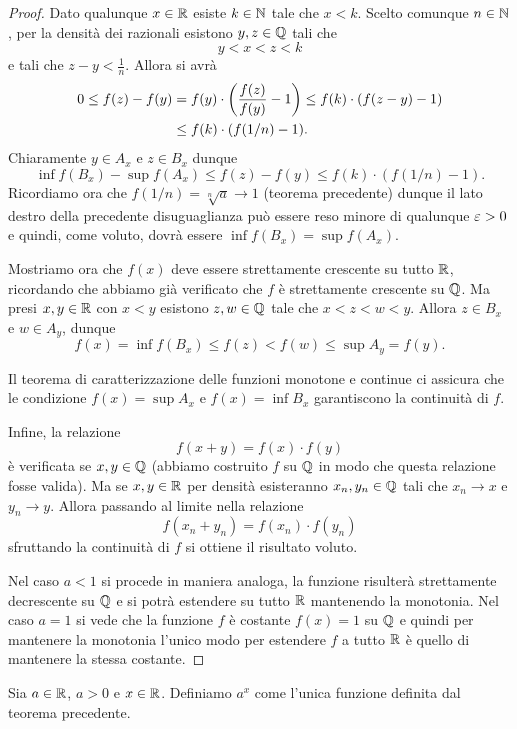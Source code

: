 \begin{proof}
Dato qualunque $x\in \mathbb R$ esiste $k\in \mathbb N$ tale che $x < k$.
Scelto comunque $n \in \mathbb N$, per la densità dei razionali
esistono $y,z\in \mathbb Q$ tali che
\[
  y < x < z < k
\]
e tali che $z-y< \frac 1 n$. Allora si avrà
\begin{align*}
  0 \le f(z) - f(y)
  &= f(y)\cdot{\left( \frac{f(z)}{f(y)}-1 \right)}
  \le f(k)\cdot {\left( f(z-y)-1 \right)}\\
  &\le f(k)\cdot {\left( f(1/n)-1 \right)}.
\end{align*}
Chiaramente $y\in A_x$ e $z\in B_x$ dunque
\[
\inf f(B_x) - \sup f(A_x) \le f(z) - f(y) \le f(k) \cdot (f(1/n)-1).
\]
Ricordiamo ora che $f(1/n) = \sqrt[n]{a} \to 1$ (teorema precedente)
dunque il lato destro della precedente disuguaglianza può essere reso
minore di qualunque $\varepsilon>0$
e quindi, come voluto,
dovrà essere $\inf f(B_x) = \sup f(A_x)$.

Mostriamo ora che $f(x)$ deve essere strettamente crescente su tutto $\mathbb R$,
ricordando
che abbiamo già verificato che $f$ è strettamente crescente su $\mathbb Q$.
Ma presi $x,y\in \mathbb R$ con $x<y$ esistono $z,w\in \mathbb Q$ tale che $x<z<w<y$.
Allora $z\in B_x$ e $w\in A_y$, dunque
\[
  f(x) = \inf f(B_x) \le f(z) < f(w) \le \sup A_y = f(y).
\]

Il teorema di caratterizzazione delle funzioni monotone e continue
ci assicura che le condizione $f(x) = \sup A_x$ e $f(x)= \inf B_x$
garantiscono la continuità di $f$.

Infine, la relazione
\[
  f(x+y) = f(x) \cdot f(y)
\]
è verificata se $x,y \in \mathbb Q$ (abbiamo costruito $f$ su $\mathbb Q$ in modo
che questa relazione fosse valida).
Ma se $x,y \in \mathbb R$ per densità esisteranno $x_n, y_n\in \mathbb Q$ tali
che $x_n\to x$ e $y_n\to y$. Allora passando al limite
nella relazione
\[
  f(x_n+y_n) = f(x_n)\cdot f(y_n)
\]
sfruttando la continuità di $f$ si ottiene il risultato voluto.

Nel caso $a<1$ si procede in maniera analoga, la funzione risulterà strettamente
 decrescente su $\mathbb Q$ e si potrà estendere su tutto $\mathbb R$ mantenendo
 la monotonia. Nel caso $a=1$ si vede che la funzione $f$ è costante $f(x)=1$
 su $\mathbb Q$ e quindi
per mantenere la monotonia l'unico modo per estendere $f$ a tutto $\mathbb R$ è quello
di mantenere la stessa costante.
\end{proof}

\begin{definition}
Sia $a\in \mathbb R$, $a>0$ e $x\in \mathbb R$.
Definiamo $a^x$ come
l'unica funzione definita dal teorema precedente.
\end{definition}

